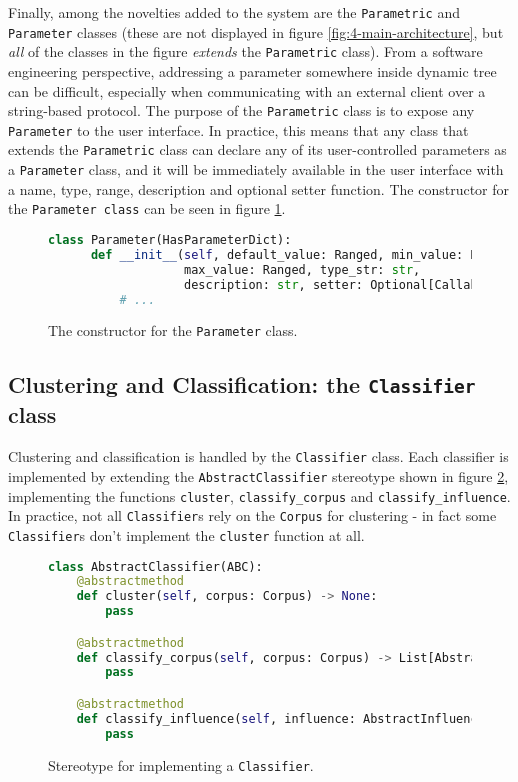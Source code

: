 Finally, among the novelties added to the system are the \texttt{Parametric} and \texttt{Parameter} classes (these are not displayed in figure \ref{fig:4-main-architecture}, but \textit{all} of the classes in the figure \textit{extends} the \texttt{Parametric} class). From a software engineering perspective, addressing a parameter somewhere inside dynamic tree can be difficult, especially when communicating with an external client over a string-based protocol. The purpose of the \texttt{Parametric} class is to expose any \texttt{Parameter} to the user interface. In practice, this means that any class that extends the \texttt{Parametric} class can declare any of its user-controlled parameters as a \texttt{Parameter} class, and it will be immediately available in the user interface with a name, type, range, description and optional setter function. The constructor for the \texttt{Parameter class} can be seen in figure \ref{fig:4-parameter}.
 
 \begin{figure}
 \begin{lstlisting}[language=Python]
 class Parameter(HasParameterDict):
      def __init__(self, default_value: Ranged, min_value: Ranged, 
                   max_value: Ranged, type_str: str, 
                   description: str, setter: Optional[Callable]):
          # ...
 \end{lstlisting}	
 \caption{The constructor for the \texttt{Parameter} class.}
 \label{fig:4-parameter}
 \end{figure}

 
 \subsection{Clustering and Classification: the \texttt{Classifier} class}\label{sec:4-main-architecture-classifiers}
 Clustering and classification is handled by the \texttt{Classifier} class. Each classifier is implemented by extending the \texttt{AbstractClassifier} stereotype shown in figure \ref{fig:4-classifier}, implementing the functions \texttt{cluster}, \texttt{classify\_corpus} and \texttt{classify\_\-influence}. In practice, not all \texttt{Classifier}s rely on the \texttt{Corpus} for clustering - in fact some \texttt{Classifier}s don't implement the \texttt{cluster} function at all.
 
 \begin{figure}
 \begin{lstlisting}[language=Python]
 class AbstractClassifier(ABC):
    @abstractmethod
    def cluster(self, corpus: Corpus) -> None:
        pass

    @abstractmethod
    def classify_corpus(self, corpus: Corpus) -> List[AbstractLabel]:
        pass

    @abstractmethod
    def classify_influence(self, influence: AbstractInfluence) -> AbstractLabel:
        pass	
 \end{lstlisting}
 \caption{Stereotype for implementing a \texttt{Classifier}.}
 \label{fig:4-classifier}
 \end{figure}
 
